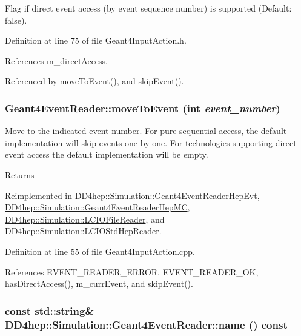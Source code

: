 Flag if direct event access (by event sequence number) is supported (Default: false). 

Definition at line 75 of file Geant4InputAction.h.

References m\_\-directAccess.

Referenced by moveToEvent(), and skipEvent().\hypertarget{class_d_d4hep_1_1_simulation_1_1_geant4_event_reader_a0b6d2fe12ae259534cbe7a5b6e35b642}{
\subsubsection[{moveToEvent}]{ Geant4EventReader::moveToEvent (int {\em event\_\-number})}}
\label{class_d_d4hep_1_1_simulation_1_1_geant4_event_reader_a0b6d2fe12ae259534cbe7a5b6e35b642}


Move to the indicated event number. For pure sequential access, the default implementation will skip events one by one. For technologies supporting direct event access the default implementation will be empty.

\begin{DoxyReturn}{Returns}

\end{DoxyReturn}


Reimplemented in \hyperlink{class_d_d4hep_1_1_simulation_1_1_geant4_event_reader_hep_evt_a9e8bf8ad3882ab62d481c6020b9adaed}{DD4hep::Simulation::Geant4EventReaderHepEvt}, \hyperlink{class_d_d4hep_1_1_simulation_1_1_geant4_event_reader_hep_m_c_a95ba8736c8274f5b24b6cd0e0b424c33}{DD4hep::Simulation::Geant4EventReaderHepMC}, \hyperlink{class_d_d4hep_1_1_simulation_1_1_l_c_i_o_file_reader_ad4648d75cd88d24476ff41e493b5c0ed}{DD4hep::Simulation::LCIOFileReader}, and \hyperlink{class_d_d4hep_1_1_simulation_1_1_l_c_i_o_std_hep_reader_a5f91d2bbdab11ee4554abf164acf1e1e}{DD4hep::Simulation::LCIOStdHepReader}.

Definition at line 55 of file Geant4InputAction.cpp.

References EVENT\_\-READER\_\-ERROR, EVENT\_\-READER\_\-OK, hasDirectAccess(), m\_\-currEvent, and skipEvent().\hypertarget{class_d_d4hep_1_1_simulation_1_1_geant4_event_reader_adc07fc968ac88303779f1ff633bfe254}{
\subsubsection[{name}]{\setlength{\rightskip}{0pt plus 5cm}const std::string\& DD4hep::Simulation::Geant4EventReader::name () const}}
\label{class_d_d4hep_1_1_simulation_1_1_geant4_event_reader_adc07fc968ac88303779f1ff633bfe254}


